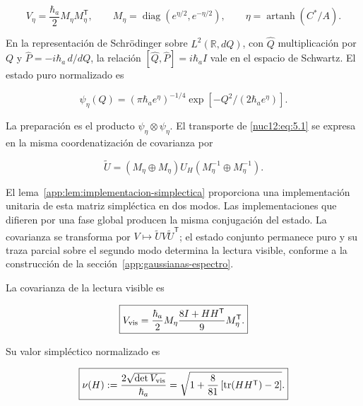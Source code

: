 \begin{equation}
V_\eta=\frac{\hbar_a}{2}M_\eta M_\eta^{\mathsf T},\qquad
M_\eta=\operatorname{diag}(e^{\eta/2},e^{-\eta/2}),\qquad
\eta=\operatorname{artanh}(C^*/A).
\label{nuc12:eq:5.4}
\end{equation}



En la representación de Schrödinger sobre \(L^2(\mathbb R,dQ)\), con \(\widehat Q\) multiplicación por \(Q\) y \(\widehat P=-i\hbar_a\,d/dQ\), la relación \([\widehat Q,\widehat P]=i\hbar_a I\) vale en el espacio de Schwartz. El estado puro normalizado es



\[
\psi_\eta(Q)=(\pi\hbar_a e^\eta)^{-1/4}
\exp[-Q^2/(2\hbar_a e^\eta)].
\]



La preparación es el producto \(\psi_\eta\otimes\psi_\eta\). El transporte de \eqref{nuc12:eq:5.1} se expresa en la misma coordenatización de covarianza por



\begin{equation}
\widetilde U=(M_\eta\oplus M_\eta)U_H
(M_\eta^{-1}\oplus M_\eta^{-1}).
\label{nuc12:eq:5.5}
\end{equation}



El lema~\ref{app:lem:implementacion-simplectica} proporciona una implementación unitaria de esta matriz simpléctica en dos modos. Las implementaciones que difieren por una fase global producen la misma conjugación del estado. La covarianza se transforma por \(V\mapsto\widetilde U V\widetilde U^{\mathsf T}\); el estado conjunto permanece puro y su traza parcial sobre el segundo modo determina la lectura visible, conforme a la construcción de la sección~\ref{app:gaussianas-espectro}.

\begin{theorem}

La covarianza de la lectura visible es



\begin{equation}
\boxed{V_{\rm vis}=
\frac{\hbar_a}{2}M_\eta
\frac{8I+HH^{\mathsf T}}9
M_\eta^{\mathsf T}.}
\label{nuc12:eq:5.6}
\end{equation}



Su valor simpléctico normalizado es



\begin{equation}
\boxed{\nu(H):=\frac{2\sqrt{\det V_{\rm vis}}}{\hbar_a}
=\sqrt{1+\frac8{81}\left[\operatorname{tr}(HH^{\mathsf T})-2\right]}.}
\label{nuc12:eq:5.7}
\end{equation}
\end{theorem}



